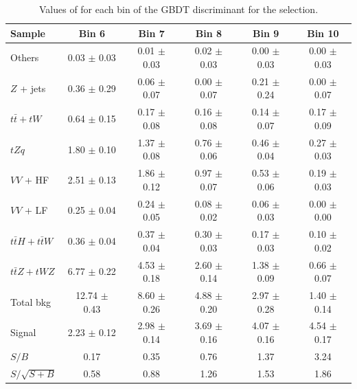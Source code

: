 \begin{table}[!h]
	\centering
	\small
	\begin{tabular}{|l|c|c|c|c|c|} 
		\hline 
		Sample 			       & Bin 6            & Bin 7           & Bin 8           & Bin 9           & Bin 10          \\ 
		\hline                 
		Others 			       & 0.03  $\pm$ 0.03 & 0.01 $\pm$ 0.03 & 0.02 $\pm$ 0.03 & 0.00 $\pm$ 0.03 & 0.00 $\pm$ 0.03 \\
		$Z$ + jets             & 0.36  $\pm$ 0.29 & 0.06 $\pm$ 0.07 & 0.00 $\pm$ 0.07 & 0.21 $\pm$ 0.24 & 0.00 $\pm$ 0.07 \\
		$t\bar{t}+tW$          & 0.64  $\pm$ 0.15 & 0.17 $\pm$ 0.08 & 0.16 $\pm$ 0.08 & 0.14 $\pm$ 0.07 & 0.17 $\pm$ 0.09 \\
		$tZq$ 			       & 1.80  $\pm$ 0.10 & 1.37 $\pm$ 0.08 & 0.76 $\pm$ 0.06 & 0.46 $\pm$ 0.04 & 0.27 $\pm$ 0.03 \\
		$VV$ + HF              & 2.51  $\pm$ 0.13 & 1.86 $\pm$ 0.12 & 0.97 $\pm$ 0.07 & 0.53 $\pm$ 0.06 & 0.19 $\pm$ 0.03 \\
		$VV$ + LF              & 0.25  $\pm$ 0.04 & 0.24 $\pm$ 0.05 & 0.08 $\pm$ 0.02 & 0.06 $\pm$ 0.03 & 0.00 $\pm$ 0.00 \\
		$t\bar{t}H+t\bar{t}W$  & 0.36  $\pm$ 0.04 & 0.37 $\pm$ 0.04 & 0.30 $\pm$ 0.03 & 0.17 $\pm$ 0.03 & 0.10 $\pm$ 0.02 \\
		$t\bar{t}Z+tWZ$        & 6.77  $\pm$ 0.22 & 4.53 $\pm$ 0.18 & 2.60 $\pm$ 0.14 & 1.38 $\pm$ 0.09 & 0.66 $\pm$ 0.07 \\
		\hline                                                                                                           
		Total bkg              & 12.74 $\pm$ 0.43 & 8.60 $\pm$ 0.26 & 4.88 $\pm$ 0.20 & 2.97 $\pm$ 0.28 & 1.40 $\pm$ 0.14 \\
		\hline                                                                                                           
		Signal                 & 2.23  $\pm$ 0.12 & 2.98 $\pm$ 0.14 & 3.69 $\pm$ 0.16 & 4.07 $\pm$ 0.16 & 4.54 $\pm$ 0.17 \\
		\hline                 
		$S/B$                  & 0.17             & 0.35            & 0.76            & 1.37            & 3.24            \\
		$S/\sqrt{S+B}$         & 0.58             & 0.88            & 1.26            & 1.53            & 1.86       \\
		\hline
	\end{tabular} 
	\caption{Values of \ssplusb for each bin of the GBDT discriminant for the \DLrc selection.}%
	\label{tab:yields:sr3_dl1rc_bdt}
\end{table}


